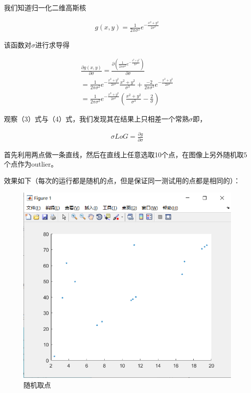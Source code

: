 \documentclass{article}
\begin{document}
    我们知道归一化二维高斯核
    
    \begin{align}
        g(x,y) = \frac{1}{2\pi\sigma^2} e^{-\frac{x^2+y^2}{2\sigma^2}}\nonumber
    \end{align}

    该函数对$\sigma$进行求导得

    \begin{align}
        \frac{\partial g(x,y)}{\partial\sigma} = \frac{\partial (\frac{1}{2\pi\sigma^2}e^{-\frac{x^2+y^2}{2\sigma^2}})}{\partial\sigma}\nonumber\\
        =\frac{1}{2\pi\sigma^2} e ^{-\frac{x^2+y^2}{2\sigma^2}} \frac{x^2+y^2}{\sigma^3}+\frac{-2}{2\pi\sigma^3} e ^{-\frac{x^2+y^2}{2\sigma^2}}\nonumber\\
        =\frac{1}{2\pi\sigma^2} e^{-\frac{x^2+y^2}{2\sigma^2}}(\frac{x^2+y^2}{\sigma^3}-\frac{2}{\sigma})
    \end{align}

    观察（3）式与（4）式，我们发现其在结果上只相差一个常熟$\sigma$即，

    \begin{align}
        \sigma LoG = \frac{\partial g}{\partial \sigma}
    \end{align}

    首先利用两点做一条直线，然后在直线上任意选取10个点，在图像上另外随机取5个点作为outlier。
    
    效果如下（每次的运行都是随机的点，但是保证同一测试用的点都是相同的）：
    \begin{figure}
        \centering
        \includegraphics[width=0.7\linewidth]{img/1.png}
        \caption{随机取点}
        \label{}
    \end{figure}
\end{document}
